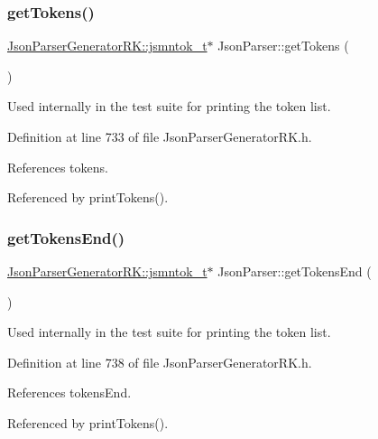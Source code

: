 \subsubsection{\texorpdfstring{get\+Tokens()}{getTokens()}}
{\footnotesize\ttfamily \hyperlink{struct_json_parser_generator_r_k_1_1jsmntok__t}{Json\+Parser\+Generator\+R\+K\+::jsmntok\+\_\+t}$\ast$ Json\+Parser\+::get\+Tokens (\begin{DoxyParamCaption}{ }\end{DoxyParamCaption})\hspace{0.3cm}{\ttfamily [inline]}}



Used internally in the test suite for printing the token list. 



Definition at line 733 of file Json\+Parser\+Generator\+R\+K.\+h.



References tokens.



Referenced by print\+Tokens().

\mbox{\label{class_json_parser_a8e0503af76c2bc9b8d2231dddb8b1cb3}} 
\subsubsection{\texorpdfstring{get\+Tokens\+End()}{getTokensEnd()}}
{\footnotesize\ttfamily \hyperlink{struct_json_parser_generator_r_k_1_1jsmntok__t}{Json\+Parser\+Generator\+R\+K\+::jsmntok\+\_\+t}$\ast$ Json\+Parser\+::get\+Tokens\+End (\begin{DoxyParamCaption}{ }\end{DoxyParamCaption})\hspace{0.3cm}{\ttfamily [inline]}}



Used internally in the test suite for printing the token list. 



Definition at line 738 of file Json\+Parser\+Generator\+R\+K.\+h.



References tokens\+End.



Referenced by print\+Tokens().

\mbox{\label{class_json_parser_a5f9e5c2453307a99a54fcf26fbd68dd4}} 
